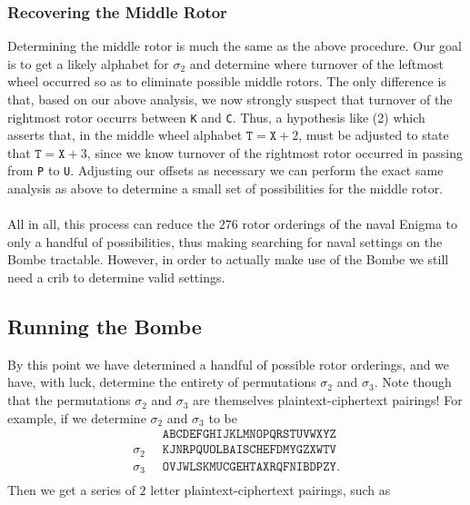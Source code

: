 \subsubsection{Recovering the Middle Rotor}
Determining the middle rotor is much the same as the above
procedure. Our goal is to get a likely alphabet for $\sigma_2$ and
determine where turnover of the leftmost wheel occurred so as to
eliminate possible middle rotors. The only difference is that, based
on our above analysis, we
now strongly suspect that turnover of the rightmost rotor occurrs
between \texttt{K} and \texttt{C}. Thus, a hypothesis like (2) which
asserts that, in the middle wheel alphabet $\texttt{T} = \texttt{X}
+ 2$, must be adjusted to state that $\texttt{T} = \texttt{X} + 3$,
since we know turnover of the rightmost rotor occurred in passing
from \texttt{P} to \texttt{U}. Adjusting our offsets as necessary
we can perform the exact same analysis as above to determine a
small set of possibilities for the middle rotor.
\\\\All in all, this process can reduce the $276$ rotor orderings
of the naval Enigma to only a handful of possibilities, thus making
searching for naval settings on the Bombe tractable. However, in
order to actually make use of the Bombe we still need a crib to
determine valid settings.

\subsection{Running the Bombe}
By this point we have determined a handful of possible rotor
orderings, and we have, with luck, determine the entirety of
permutations $\sigma_2$ and $\sigma_3$. Note though that the
permutations $\sigma_2$ and $\sigma_3$ are themselves
plaintext-ciphertext pairings! For example, if we determine
$\sigma_2$ and $\sigma_3$ to be
\begin{align*}
  & \texttt{ABCDEFGHIJKLMNOPQRSTUVWXYZ} \\
  \sigma_2\;\; & \texttt{KJNRPQUOLBAISCHEFDMYGZXWTV} \\
  \sigma_3\;\; & \texttt{OVJWLSKMUCGEHTAXRQFNIBDPZY}. \\
\end{align*}
Then we get a series of $2$ letter plaintext-ciphertext pairings, such as

